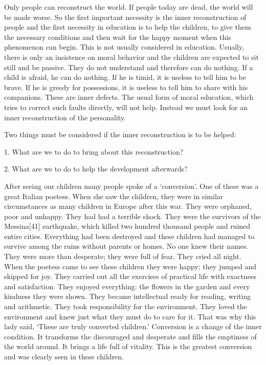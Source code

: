 \documentclass[lang=cn,10pt]{elegantbook}
\begin{document}
Only people can reconstruct the world. If people today are
dead, the world will be made worse. So the first important necessity
is the inner reconstruction of people and the first necessity in
education is to help the children, to give them the necessary
conditions and then wait for the happy moment when this
phenomenon can begin. This is not usually considered in education.
Usually, there is only an insistence on moral behavior and the
children are expected to sit still and be passive. They do not
understand and therefore can do nothing. If a child is afraid, he can
do nothing. If he is timid, it is useless to tell him to be brave. If he is
greedy for possessions, it is useless to tell him to share with his
companions. These are inner defects. The usual form of moral
education, which tries to correct such faults directly, will not help.
Instead we must look for an inner reconstruction of the personality.

Two things must be considered if the inner reconstruction is to
be helped:

1. What are we to do to bring about this reconstruction?

2. What are we to do to help the development afterwards?

After seeing our children many people spoke of a ‘conversion’. One
of these was a great Italian poetess. When she saw the children,
they were in similar circumstances as many children in Europe after
this war. They were orphaned, poor and unhappy. They had had a
terrible shock. They were the survivors of the Messina[41]
earthquake, which killed two hundred thousand people and ruined
entire cities. Everything had been destroyed and these children had
managed to survive among the ruins without parents or homes. No
one knew their names. They were more than desperate; they were
full of fear. They cried all night. When the poetess came to see these
children they were happy; they jumped and skipped for joy. They
carried out all the exercises of practical life with exactness and
satisfaction. They enjoyed everything: the flowers in the garden and
every kindness they were shown. They became intellectual ready for
reading, writing and arithmetic. They took responsibility for the
environment. They loved the environment and knew just what they
must do to care for it. That was why this lady said, ‘These are truly
converted children.’ Conversion is a change of the inner condition. It
transforms the discouraged and desperate and fills the emptiness of
the world around. It brings a life full of vitality. This is the greatest
conversion and was clearly seen in these children.
\end{document}
